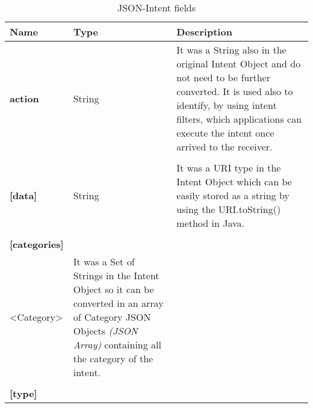 \bigskip
\bigskip
\bigskip
\bigskip
\begin{table}[h]
	\caption{JSON-Intent fields}
	\label{tab:JSON-Intent}
	\centering
	\begin{center}
		
		\begin{tabular}{>{\centering\arraybackslash} m{}p{}p{}}
			
			\toprule
			\centering\textbf{Name} & \centering\textbf{Type}  &	\textbf{Description} \\
			\midrule
			\centering\textbf{action} & \begin{minipage}[t]{0.25\textwidth}
				\centering
				String
			\end{minipage} & \begin{minipage}[t]{0.55\textwidth}
				It was a String also in the original Intent Object and do not need to be further converted. It is used also to identify, by using intent filters, which applications can execute the intent once arrived to the receiver.
			\end{minipage}\\%
		&&\\
			\centering\textbf{[data]}\footnotemark[1] & \begin{minipage}[t]{0.25\textwidth}
				\centering
				String
			\end{minipage} & \begin{minipage}[t]{0.55\textwidth}
				It was a URI type in the Intent Object which can be easily stored as a string by using the URI.toString() method in Java.
			\end{minipage}\\%
		&&\\
			\centering\textbf{[categories]} & \begin{minipage}[t]{0.25\textwidth}
			\centering
			Array\\<Category> \footnotemark[2]
		\end{minipage} & \begin{minipage}[t]{0.55\textwidth}
			It was a Set of Strings in the Intent Object so it can be converted in an array of Category JSON Objects \textit{(JSON Array)} containing all the category of the intent.
		\end{minipage}\\%
		&&\\
			\centering\textbf{[type]}\footnotemark[1] & \begin{minipage}[t]{0.25\textwidth}

\end{minipage}
\end{tabular}
\end{center}
\end{table}
